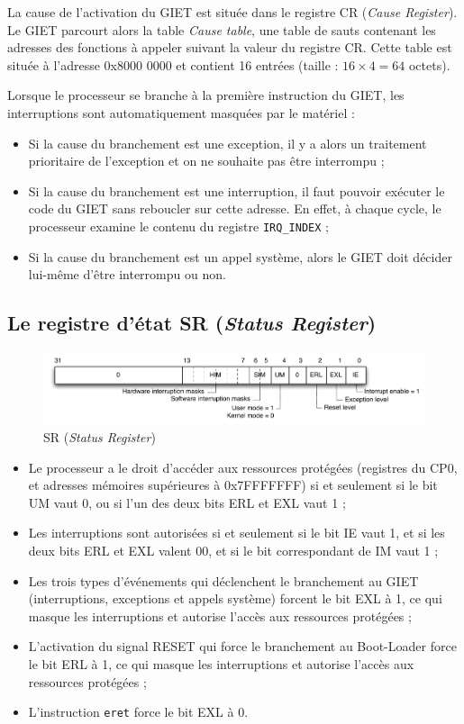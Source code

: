 \documentclass[11pt,english,french]{scrreprt}
\theoremstyle{remark}
\theoremstyle{definition}
\begin{document}
La cause de l'activation du GIET est située dans le registre CR (\emph{Cause Register}). Le GIET parcourt alors la table \emph{Cause table}, une table de sauts contenant les adresses des fonctions à appeler suivant la valeur du registre CR. Cette table est située à l'adresse 0x8000 0000 et contient 16 entrées (taille : $16\times 4=64$ octets).

Lorsque le processeur se branche à la première instruction du GIET, les interruptions sont automatiquement masquées par le matériel :\begin{itemize}
	\item Si la cause du branchement est une exception, il y a alors un traitement prioritaire de l'exception et on ne souhaite pas être interrompu ;
	\item Si la cause du branchement est une interruption, il faut pouvoir exécuter le code du GIET sans reboucler sur cette adresse. En effet, à chaque cycle, le processeur examine le contenu du registre \lstinline!IRQ_INDEX! ;
	\item Si la cause du branchement est un appel système, alors le GIET doit décider lui-même d'être interrompu ou non. 
\end{itemize}

\vspace{30pt}

\subsection{Le registre d'état SR (\emph{Status Register})} %

\begin{figure}[!h]
	\center
	\includegraphics[scale=.65]{diagrammes/SR}
	\caption{SR (\emph{Status Register})}
\end{figure}

\begin{itemize}
	\item Le processeur a le droit d’accéder aux ressources protégées (registres du CP0, et adresses mémoires supérieures à 0x7FFFFFFF) si et seulement si le bit UM vaut 0, ou si l’un des deux bits ERL et EXL vaut 1 ;
	\item Les interruptions sont autorisées si et seulement si le bit IE vaut 1, et si les deux bits ERL et EXL valent 00, et si le bit correspondant de IM vaut 1 ;
	\item Les trois types d’événements qui déclenchent le branchement au GIET (interruptions, exceptions et appels système) forcent le bit EXL à 1, ce qui masque les interruptions et autorise l’accès aux ressources protégées ;
	\item L’activation du signal RESET qui force le branchement au Boot-Loader force le bit ERL à 1, ce qui masque les interruptions et autorise l’accès aux ressources protégées ;
	\item L’instruction \lstinline!eret! force le bit EXL à 0.
\end{itemize}
\end{document}
